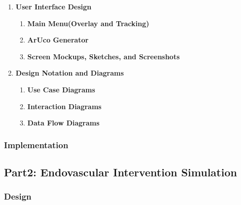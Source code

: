 \documentclass[12pt]{article}
\begin{document}
\begin{enumerate}
\begin{enumerate}
            \end{enumerate}


      \item \textbf{User Interface Design}
            \begin{enumerate}
                  \item \textbf{Main Menu(Overlay and Tracking)}


                  \item \textbf{ArUco Generator}


                  \item \textbf{Screen Mockups, Sketches, and Screenshots}


            \end{enumerate}


      \item \textbf{Design Notation and Diagrams}
            \begin{enumerate}
                  \item \textbf{Use Case Diagrams}

                  \item \textbf{Interaction Diagrams}

                  \item \textbf{Data Flow Diagrams}
            \end{enumerate}
\end{enumerate}

\subsubsection{Implementation}

\subsection{Part2: Endovascular Intervention Simulation}

\subsubsection{Design}
\end{document}
